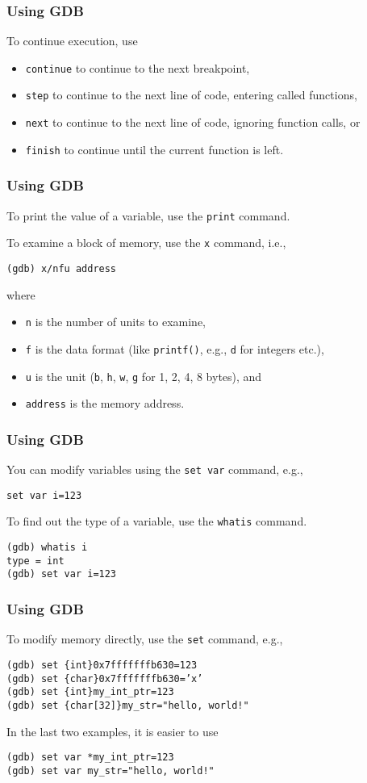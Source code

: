 \documentclass[12pt,t]{beamer}
\let\emph\relax %
\newcommand{\cmd}[1]{\begin{center}\texttt{#1}\end{center}}
\begin{document}
  \begin{frame}[fragile]
    \frametitle{Using GDB}
    
    To continue execution, use
    \begin{itemize}
      \item \texttt{continue} to continue to the next breakpoint,
      \item \texttt{step} to continue to the next line of code, entering called functions,
      \item \texttt{next} to continue to the next line of code, ignoring function calls, or
      \item \texttt{finish} to continue until the current function is left.
    \end{itemize}
  \end{frame}

  \begin{frame}[fragile]
    \frametitle{Using GDB}
    
    To print the value of a variable, use the \texttt{print} command.

    To examine a block of memory, use the \texttt{x} command, i.e.,
    \cmd{(gdb) x/nfu address}
    where
    \begin{itemize}
      \item \texttt{n} is the number of units to examine,
      \item \texttt{f} is the data format (like \texttt{printf()}, e.g., \texttt{d} for integers etc.),
      \item \texttt{u} is the unit (\texttt{b}, \texttt{h}, \texttt{w}, \texttt{g} for 1, 2, 4, 8 bytes), and
      \item \texttt{address} is the memory address.
    \end{itemize}
  \end{frame}

  \begin{frame}[fragile]
    \frametitle{Using GDB}
    
    You can modify variables using the \texttt{set var} command, e.g.,
    \cmd{set var i=123}

    To find out the type of a variable, use the \texttt{whatis} command.

    \texttt{(gdb) whatis i\\type = int\\(gdb) set var i=123}
  \end{frame}

  \begin{frame}[fragile]
    \frametitle{Using GDB}
    
    To modify memory directly, use the \texttt{set} command, e.g.,

    \texttt{(gdb) set \{int\}0x7fffffffb630=123\\(gdb) set \{char\}0x7fffffffb630='x'\\(gdb) set \{int\}my\_int\_ptr=123\\(gdb) set \{char[32]\}my\_str="hello, world!"}

    \emph{Note:} In the last two examples, it is easier to use

    \texttt{(gdb) set var *my\_int\_ptr=123\\(gdb) set var my\_str="hello, world!"}
  \end{frame}
\end{document}
